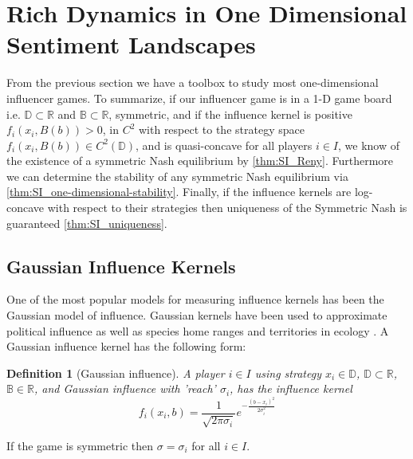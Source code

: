 \documentclass{article}
\newtheorem{definition}{Definition}
\newcommand {\R}{\mathbb{R}}
\newcommand {\D}{\mathbb{D}}
\newcommand {\B}{\mathbb{B}}
\begin{document}
    \section{Rich Dynamics in One Dimensional Sentiment Landscapes}
        From the previous section we have a toolbox to study most one-dimensional influencer games. To summarize, if our influencer game is in a 1-D game board i.e. $\D\subset \R$ and $\B\subset \R$, symmetric, and if the influence kernel is positive $f_{i}(x_i,B(b))>0$, in $C^2$ with respect to the strategy space $f_{i}(x_i,B(b))\in C^2(\D)$, and is quasi-concave for all players $i\in I$, we know of the existence of a symmetric Nash equilibrium by \cref{thm:SI_Reny}. Furthermore we can determine the stability of any symmetric Nash equilibrium via \cref{thm:SI_one-dimensional-stability}. Finally, if the influence kernels are log-concave with respect to their strategies then uniqueness of the Symmetric Nash is guaranteed \cref{thm:SI_uniqueness}. 
        \subsection{Gaussian Influence Kernels}\label{subsec:SI_Gaussian}
            One of the most popular models for measuring influence kernels has been the Gaussian model of influence. Gaussian kernels have been used to approximate political influence \cite{yang2020us} as well as species home ranges and territories in ecology \cite{}. A Gaussian influence kernel has the following form: 
            \begin{definition}[Gaussian influence]
                A player $i\in I$ using strategy $x_i\in \D$, $\D\subset\R$, $\B\in \R$, and Gaussian influence with 'reach' $\sigma_i$, has the influence kernel
                \begin{equation}\label{eq:SI_Gaussian_infl}
                    f_i(x_i,b)=\frac{1}{\sqrt{2\pi \sigma_i}}e^{-\frac{(b-x_i)^2}{2\sigma_i^2}}
                \end{equation}
            \end{definition}
            If the game is symmetric then $\sigma=\sigma_i$ for all $i\in I$. 
            
\end{document}
